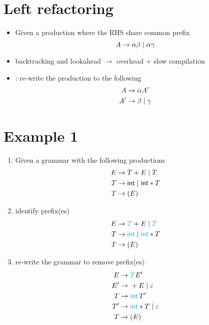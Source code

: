 \documentclass[10pt,a4paper,landscape]{article}
\begin{document}
\begin{multicols*}{3}
\section*{Left refactoring}
\begin{itemize}
\item Given a production where the RHS share common prefix
\[
  A\to \alpha\beta \;|\; \alpha\gamma
\]
\item backtracking and lookahead $\to$ overhead + slow compilation
\item {}: re-write the production to the following
  \begin{align*}
    A\to &\; \alpha A' \\
    A'\to &\; \beta \;|\; \gamma
  \end{align*}
\end{itemize}
\section*{Example 1}
\begin{enumerate}[start=0]
\item Given a grammar with the following productions
  \begin{align*}
    E\to &\; T + E \;|\; T \\
    T\to &\; \textsf{int} \;|\; \textsf{int} * T \\
    T\to &\; (E)
  \end{align*}
\item identify  prefix(es)
  \begin{align*}
    E\to &\; \mb{T} + E \gor \mb{T} \\
    T\to &\; \mb{\textsf{int}} \gor \mb{\textsf{int}} * T \\
    T\to &\; (E)
  \end{align*}
\item re-write the grammar to remove  prefix(es)
  \begin{align*}
    E\to &\; \mb{T} E'\\
    E'\to &\; + E \gor \varepsilon \\
    T\to &\; \mb{\textsf{int}}\,T' \\
    T'\to &\; \mb{\textsf{int}} * T \gor \varepsilon \\
    T\to &\; (E)
  \end{align*}
\end{enumerate}

\end{multicols*}
\end{document}
